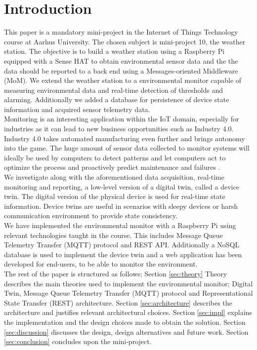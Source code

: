 \section{Introduction}
This paper is a mandatory mini-project in the Internet of Things Technology course at Aarhus University. The chosen subject is mini-project 10, the weather station. The objective is to build a weather station using a Raspberry Pi equipped with a Sense HAT to obtain environmental sensor data and the the data should be reported to a back end using a Messages-oriented Middleware (MoM). We extend the weather station to a environmental monitor capable of measuring environmental data and real-time detection of thresholds and alarming. Additionally we added a database for persistence of device state information and acquired sensor telemetry data. \\

Monitoring is an interesting application within the IoT domain, especially for industries as it can lead to new business opportunities such as Industry 4.0. Industry 4.0 takes automated manufacturing even further and brings autonomy into the game. The huge amount of sensor data collected to monitor systems will ideally be used by computers to detect patterns and let computers act to optimize the process and proactively predict maintenance and failures \cite{gilchrist_2016}. \\

We investigate along with the aforementioned data acquisition, real-time monitoring and reporting, a low-level version of a digital twin, called a device twin. The digital version of the physical device is used for real-time state information. Device twins are useful in scenarios with sleepy devices or harsh communication environment to provide state consistency. \\

We have implemented the environmental monitor with a Raspberry Pi using relevant technologies taught in the course. This includes Message Queue Telemetry Transfer (MQTT) protocol and REST API. Additionally a NoSQL database is used to implement the device twin and a web application has been developed for end-users, to be able to monitor the environment. \\

The rest of the paper is structured as follows; Section \ref{sec:theory} Theory describes the main theories used to implement the environmental monitor; Digital Twin, Message Queue Telemetry Transfer (MQTT) protocol and Representational State Transfer (REST) architecture. Section \ref{sec:architecture} describes the architecture and justifies relevant architectural choices. Section \ref{sec:impl} explains the implementation and the design choices made to obtain the solution. Section \ref{sec:discussion} discusses the design, design alternatives and future work. Section \ref{sec:conclusion} concludes upon the mini-project.

